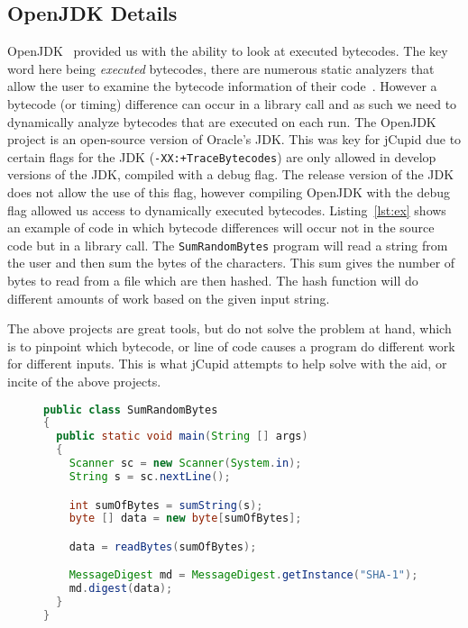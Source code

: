 \subsection{OpenJDK Details}
OpenJDK~\cite{OpenJDK} provided us with the ability to look at executed
bytecodes. The key word here being \emph{executed} bytecodes, there are numerous
static analyzers that allow the user to examine the bytecode information of
their code~\cite{vallee1999soot}. However a bytecode (or timing) difference can
occur in a library call and as such we need to dynamically analyze bytecodes
that are executed on each run. The OpenJDK project is an open-source version of
Oracle's JDK. This was key for jCupid due to certain flags for the JDK
(\texttt{-XX:+TraceBytecodes}) are only allowed in develop versions of the JDK,
compiled with a debug flag. The release version of the JDK does not allow the
use of this flag, however compiling OpenJDK with the debug flag allowed us
access to dynamically executed bytecodes. Listing~\ref{lst:ex} shows an example
of code in which bytecode differences will occur not in the source code but in a
library call. The \texttt{SumRandomBytes} program will read a string from the
user and then sum the bytes of the characters. This sum gives the number of
bytes to read from a file which are then hashed. The hash function will do
different amounts of work based on the given input string. 

The above projects are great tools, but do not solve the problem at hand, which
is to pinpoint which bytecode, or line of code causes a program do different
work for different inputs. This is what jCupid attempts to help solve with the
aid, or incite of the above projects. 

\begin{figure}[t]
  \begin{center}
    \begin{lstlisting}[caption={Example of code with bytecode difference in
    Library call},label={lst:ex},language=Java] 
public class SumRandomBytes
{
  public static void main(String [] args)
  {
    Scanner sc = new Scanner(System.in);
    String s = sc.nextLine();

    int sumOfBytes = sumString(s);
    byte [] data = new byte[sumOfBytes];

    data = readBytes(sumOfBytes);

    MessageDigest md = MessageDigest.getInstance("SHA-1");
    md.digest(data);
  }
}
    \end{lstlisting}
  \end{center}
\end{figure}
